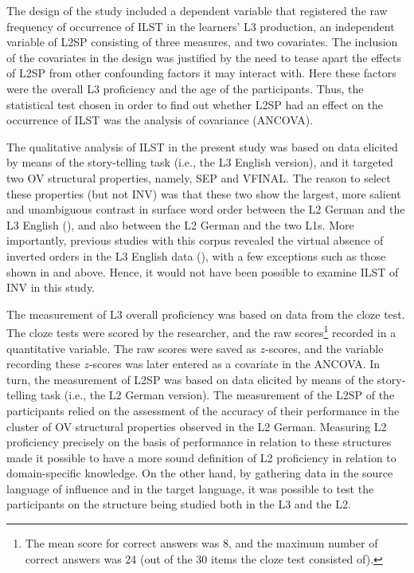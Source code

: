 \documentclass[output=paper,modfonts,nonflat, newtxmath]{langsci/langscibook}
\begin{document}
The design of the study included a dependent variable that registered the raw frequency of occurrence of ILST in the learners’ L3 production, an independent variable of L2SP consisting of three measures, and two covariates. The inclusion of the covariates in the design was justified by the need to tease apart the effects of L2SP from other confounding factors it may interact with. Here these factors were the overall L3 proficiency and the age of the participants. Thus, the statistical test chosen in order to find out whether L2SP had an effect on the occurrence of ILST was the analysis of covariance (ANCOVA).

The qualitative analysis of ILST in the present study was based on data elicited by means of the story-telling task (i.e., the L3 English version), and it targeted two OV structural properties, namely, SEP and VFINAL. The reason to select these properties (but not INV) was that these two show the largest, more salient and unambiguous contrast in surface word order between the L2 German and the L3 English (\citealt[293]{Gawlitzek-MaiwaldTracy2005}), and also between the L2 German and the two L1s. More importantly, previous studies with this corpus revealed the virtual absence of inverted orders in the L3 English data (\citealt{Sánchez2010, Sánchez2011, Sánchez2012}), with a few exceptions such as those shown in  and  above. Hence, it would not have been possible to examine ILST of INV in this study.

The measurement of L3 overall proficiency was based on data from the cloze test. The cloze tests were scored by the researcher, and the raw scores\footnote{The mean score for correct answers was 8, and the maximum number of correct answers was 24 (out of the 30 items the cloze test consisted of).} recorded in a quantitative variable. The raw scores were saved as $z$-scores, and the variable recording these $z$-scores was later entered as a covariate in the ANCOVA. In turn, the measurement of L2SP was based on data elicited by means of the story-telling task (i.e., the L2 German version). The measurement of the L2SP of the participants relied on the assessment of the accuracy of their performance in the cluster of OV structural properties observed in the L2 German. Measuring L2 proficiency precisely on the basis of performance in relation to these structures made it possible to have a more sound definition of L2 proficiency in relation to domain-specific knowledge. On the other hand, by gathering data in the source language of influence and in the target language, it was possible to test the participants on the structure being studied both in the L3 and the L2.
\end{document}
